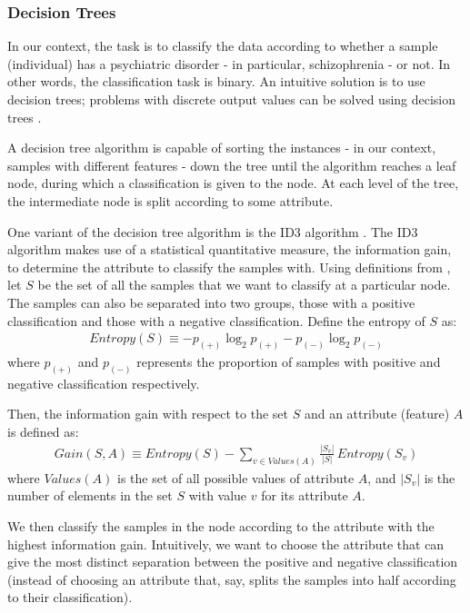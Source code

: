\documentclass[12pt, twoside, a4paper]{article}
\begin{document}
\subsubsection{Decision Trees}
In our context, the task is to classify the data according to whether a sample (individual) has a psychiatric disorder - in particular, schizophrenia - or not. In other words, the classification task is binary. An intuitive solution is to use decision trees; problems with discrete output values can be solved using decision trees \cite{RefWorks:98}.

A decision tree algorithm is capable of sorting the  instances - in our context, samples with different features - down the tree until the algorithm reaches a leaf node, during which a classification is given to the node. At each level of the tree, the intermediate node is split according to some attribute.

One variant of the decision tree algorithm is the ID3 algorithm \cite{RefWorks:99}. The ID3 algorithm makes use of a statistical quantitative measure, the information gain, to determine the attribute to classify the samples with. Using definitions from \cite{RefWorks:98}, let $S$ be the set of all the samples that we want to classify at a particular node. The samples can also be separated into two groups, those with a positive classification and those with a negative classification. Define the entropy of $S$ as:
\begin{align*}
Entropy(S) \equiv -p_{(+)} \log_2 p_{(+)} - p_{(-)} \log_2 p_{(-)}
\end{align*}
where $p_{(+)}$ and $p_{(-)}$ represents the proportion of samples with positive and negative classification respectively.

Then, the information gain with respect to the set $S$ and an attribute (feature) $A$ is defined as:
\begin{align*}
Gain(S, A) \equiv Entropy(S) - \sum_{v \in Values(A)} \frac{|S_v|}{|S|} \, Entropy(S_v)
\end{align*}
where $Values(A)$ is the set of all possible values of attribute $A$, and $|S_v|$ is the number of elements in the set $S$ with value $v$ for its attribute $A$.

We then classify the samples in the node according to the attribute with the highest information gain. Intuitively, we want to choose the attribute that can give the most distinct separation between the positive and negative classification (instead of choosing an attribute that, say, splits the samples into half  according to their classification).
\end{document}
